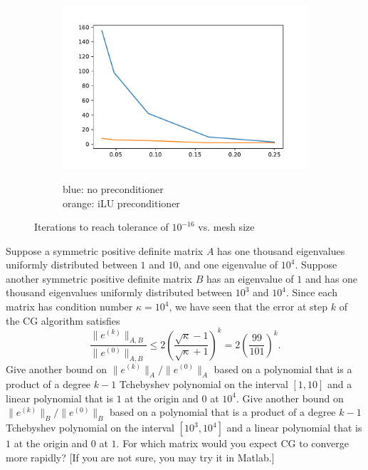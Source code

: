 \documentclass[10pt]{article}
\begin{document}
\begin{solution}[Solution]
\begin{figure}[H]\centering
    \begin{subfigure}{.6\textwidth}
        \includegraphics[width=\textwidth]{img/1/iter_vs_h_cg.pdf}
    \end{subfigure}
    \begin{subfigure}{.25\textwidth}
        blue: no preconditioner \\
        orange: iLU preconditioner
    \end{subfigure}
    \caption{Iterations to reach tolerance of \( 10^{-16} \) vs. mesh size}
    \label{itervshcg}
\end{figure}

\end{solution}

\begin{problem}[Problem 2]
Suppose a symmetric positive definite matrix \( A \) has one thousand eigenvalues uniformly distributed between \( 1 \) and \( 10 \), and one eigenvalue of \( 10^4 \). Suppose another symmetric positive definite matrix \( B \) has an eigenvalue of \( 1 \) and has one thousand eigenvalues uniformly distributed between \( 10^3 \) and \( 10^4 \). Since each matrix has condition number \( \kappa = 10^4 \), we have seen that the error at step \( k \) of the CG algorithm satisfies
    \[
\frac{\| e^{(k)} \|_{A,B}}{\| e^{(0)} \|_{A,B}} \leq 2 \left( \frac{
\sqrt{\kappa} - 1}{\sqrt{\kappa} +1} \right)^k = 2 \left( \frac{99}{101} 
\right)^k .
\]
Give another bound on \( \| e^{(k)} \|_A / \| e^{(0)} \|_A \) based on a polynomial that is a product of a degree \( k-1 \) Tchebyshev polynomial on the interval \( [1,10] \) and a linear polynomial that is \( 1 \) at the origin and \( 0 \) at \( 10^4 \).  Give another bound on \( \| e^{(k)} \|_B / \| e^{(0)} \|_B \)  based on a polynomial that is a product of a degree  \( k-1 \) Tchebyshev polynomial on the interval \( [ 10^3 , 10^4] \) and a linear polynomial that is \( 1 \) at the origin and \( 0 \) at \( 1 \).  For which matrix would you expect CG to converge more rapidly?  [If you are not sure, you may try it in Matlab.]
\end{problem}
\end{document}
